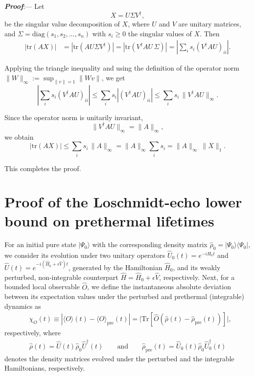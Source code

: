 \documentclass[aps,prl,amsfonts,floatfix,superscriptaddress,longbibliography,twocolumn,footinbib]{revtex4-2}
\begin{document}
\textit{\textbf{Proof}}:---
Let 
\begin{equation}
X = U \Sigma V^\dagger,
\end{equation}
be the singular value decomposition of $X$, 
where $U$ and $V$ are unitary matrices, and $\Sigma = \mathrm{diag}(s_1, s_2, \dots, s_n)$ with $s_i \ge 0$ the singular values of $X$. Then
\begin{align}
|\mathrm{tr}(A X)| &= |\mathrm{tr}(A U \Sigma V^\dagger)| = |\mathrm{tr}(V^\dagger A U \, \Sigma)| = \left| \sum_i s_i (V^\dagger A U)_{ii} \right|.
\end{align}

Applying the triangle inequality and using the definition of the operator norm $\|W\|_{\infty} := \sup_{\|v\|=1} \|W v\|$, we get
\begin{equation}
\left| \sum_i s_i (V^\dagger A U)_{ii} \right| \le \sum_i s_i |(V^\dagger A U)_{ii}| \le \sum_i s_i \, \|V^\dagger A U\|_{\infty}.
\end{equation}

Since the operator norm is unitarily invariant,
\begin{equation}
\|V^\dagger A U\|_{\infty} = \|A\|_{\infty},
\end{equation}
we obtain
\begin{equation}
|\mathrm{tr}(A X)| \le \sum_i s_i \, \|A\|_{\infty} = \|A\|_{\infty} \sum_i s_i = \|A\|_{\infty} ~ \|X\|_1.
\end{equation}

This completes the proof.


\section{Proof of the Loschmidt-echo lower bound on prethermal lifetimes} \label{APP:prethermal-timscale-proof}


For an initial pure state $| \Psi_0 \rangle$ with the corresponding density matrix $\hat\rho_0 = | \Psi_0 \rangle \langle \Psi_0|  $, we consider its evolution under two unitary operators $\hat U_0(t) = e^{-i\hat H_0 t  }$ and $\hat U(t) =e^{-i (\hat H_0 + \epsilon \hat V)  t  }$, generated by the Hamiltonian $\hat{H}_0$, and its weakly perturbed, non-integrable counterpart  $\hat H = \hat{H}_0 + \epsilon \hat V$, respectively. Next, for a bounded local observable $\hat O$, we define the instantaneous absolute deviation between its expectation values under the perturbed and prethermal (integrable) dynamics as 
\begin{align}
    & \chi_O(t) \equiv | \langle O \rangle(t) - \langle O \rangle_{\text{pre}}(t)|= \biggr|\text{Tr}[ \hat O (\hat{\rho}(t) - \hat{\rho}_{\text{pre}}(t) ) ]\biggr|, \label{eq:observable-deviation}
\end{align}
respectively, where
\begin{align}
    \hat\rho(t) = \hat U (t) \hat \rho_0 \hat U^\dagger (t) \qquad \text{and} \qquad \hat\rho_{\text{pre}}(t) = \hat U_0 (t) \hat \rho_0 \hat U^\dagger_0 (t)
\end{align}
denotes the density matrices evolved under the perturbed and the integrable Hamiltonians, respectively.
\end{document}
